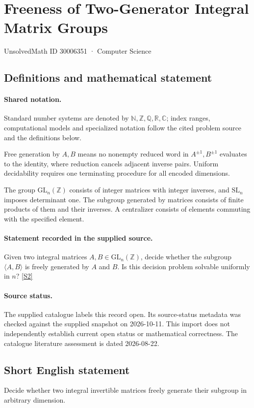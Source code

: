 \documentclass[11pt]{article}
\newcommand{\sref}[2]{\hyperlink{source:#1:#2}{[S#2]}}
\begin{document}
\setcounter{section}{30006350}
\section{Freeness of Two-Generator Integral Matrix Groups}\label{30006351}
{\small\sffamily UnsolvedMath ID 30006351 · Computer Science}
\subsection{Definitions and mathematical statement}

\paragraph{Shared notation.}Standard number systems are denoted by $\mathbb N,\mathbb Z,\mathbb Q,\mathbb R,\mathbb C$; index ranges, computational models and specialized notation follow the cited problem source and the definitions below.


Free generation by $A,B$ means no nonempty reduced word in $A^{\pm1},B^{\pm1}$ evaluates to the identity, where reduction cancels adjacent inverse pairs. Uniform decidability requires one terminating procedure for all encoded dimensions.

The group $\mathrm{GL}_n(\mathbb Z)$ consists of integer matrices with integer inverses, and $\mathrm{SL}_n$ imposes determinant one. The subgroup generated by matrices consists of finite products of them and their inverses. A centralizer consists of elements commuting with the specified element.
\paragraph{Statement recorded in the supplied source.}
Given two integral matrices $A,B\in\mathrm{GL}_n(\mathbb{Z})$, decide whether the subgroup $\langle A,B\rangle$ is freely generated by $A$ and $B$. Is this decision problem solvable uniformly in $n$? \sref{30006351}{2}
\paragraph{Source status.}
The supplied catalogue labels this record open. Its source-status metadata was checked against the supplied snapshot on 2026-10-11. This import does not independently establish current open status or mathematical correctness. The catalogue literature assessment is dated 2026-08-22.
\subsection{Short English statement}
Decide whether two integral invertible matrices freely generate their subgroup in arbitrary dimension.
\end{document}

